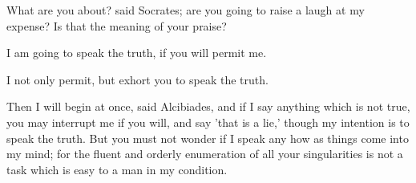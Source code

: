 \documentclass[11pt,letter]{article}
\begin{document}
\par  What are you about? said Socrates; are you going to raise a laugh at my expense? Is that the meaning of your praise?

\par  I am going to speak the truth, if you will permit me.

\par  I not only permit, but exhort you to speak the truth.

\par  Then I will begin at once, said Alcibiades, and if I say anything which is not true, you may interrupt me if you will, and say 'that is a lie,' though my intention is to speak the truth. But you must not wonder if I speak any how as things come into my mind; for the fluent and orderly enumeration of all your singularities is not a task which is easy to a man in my condition.
\end{document}
